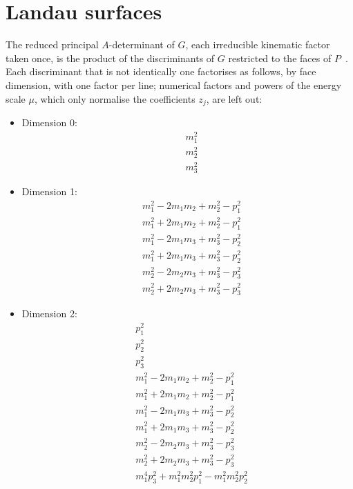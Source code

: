 \documentclass[11pt,a4paper]{article}
\begin{document}
\section{Landau surfaces}
The reduced principal $A$-determinant of $G$, each irreducible kinematic factor taken once, is the product of the discriminants of $G$ restricted to the faces of $P$~\cite{gkz1994,dhpt2023,fmt2023}. Each discriminant that is not identically one factorises as follows, by face dimension, with one factor per line; numerical factors and powers of the energy scale $\mu$, which only normalise the coefficients $z_j$, are left out:
\begin{itemize}
\item Dimension 0:
\begin{align*}
&m_{1}^{2} \\
&m_{2}^{2} \\
&m_{3}^{2}
\end{align*}
\item Dimension 1:
\begin{align*}
&m_{1}^{2} - 2 m_{1} m_{2} + m_{2}^{2} - p^{2}_{1} \\
&m_{1}^{2} + 2 m_{1} m_{2} + m_{2}^{2} - p^{2}_{1} \\
&m_{1}^{2} - 2 m_{1} m_{3} + m_{3}^{2} - p^{2}_{2} \\
&m_{1}^{2} + 2 m_{1} m_{3} + m_{3}^{2} - p^{2}_{2} \\
&m_{2}^{2} - 2 m_{2} m_{3} + m_{3}^{2} - p^{2}_{3} \\
&m_{2}^{2} + 2 m_{2} m_{3} + m_{3}^{2} - p^{2}_{3}
\end{align*}
\item Dimension 2:
\begin{align*}
&p^{2}_{1} \\
&p^{2}_{2} \\
&p^{2}_{3} \\
&m_{1}^{2} - 2 m_{1} m_{2} + m_{2}^{2} - p^{2}_{1} \\
&m_{1}^{2} + 2 m_{1} m_{2} + m_{2}^{2} - p^{2}_{1} \\
&m_{1}^{2} - 2 m_{1} m_{3} + m_{3}^{2} - p^{2}_{2} \\
&m_{1}^{2} + 2 m_{1} m_{3} + m_{3}^{2} - p^{2}_{2} \\
&m_{2}^{2} - 2 m_{2} m_{3} + m_{3}^{2} - p^{2}_{3} \\
&m_{2}^{2} + 2 m_{2} m_{3} + m_{3}^{2} - p^{2}_{3} \\
&m_{1}^{4} p^{2}_{3} + m_{1}^{2} m_{2}^{2} p^{2}_{1} - m_{1}^{2} m_{2}^{2} p^{2}_{2} \\

\end{align*}
\end{itemize}
\end{document}
